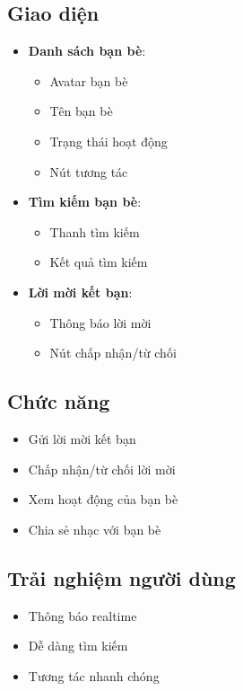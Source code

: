 \documentclass{article}
\begin{document}
\subsection{Giao diện}
\begin{itemize}
    \item \textbf{Danh sách bạn bè}:
    \begin{itemize}
        \item Avatar bạn bè
        \item Tên bạn bè
        \item Trạng thái hoạt động
        \item Nút tương tác
    \end{itemize}
    \item \textbf{Tìm kiếm bạn bè}:
    \begin{itemize}
        \item Thanh tìm kiếm
        \item Kết quả tìm kiếm
    \end{itemize}
    \item \textbf{Lời mời kết bạn}:
    \begin{itemize}
        \item Thông báo lời mời
        \item Nút chấp nhận/từ chối
    \end{itemize}
\end{itemize}

\subsection{Chức năng}
\begin{itemize}
    \item Gửi lời mời kết bạn
    \item Chấp nhận/từ chối lời mời
    \item Xem hoạt động của bạn bè
    \item Chia sẻ nhạc với bạn bè
\end{itemize}

\subsection{Trải nghiệm người dùng}
\begin{itemize}
    \item Thông báo realtime
    \item Dễ dàng tìm kiếm
    \item Tương tác nhanh chóng
\end{itemize}
\end{document}
